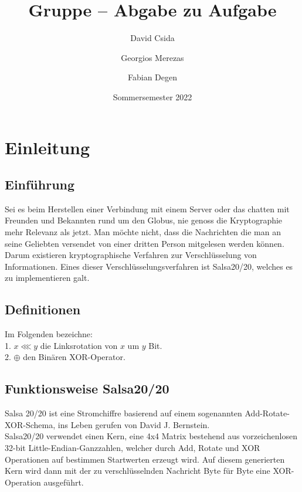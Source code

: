 \documentclass[course=erap]{aspdoc}
\author{David Csida \and Georgios Merezas \and Fabian Degen}
\date{Sommersemester 2022} %
\title{Gruppe \theGroup{} -- Abgabe zu Aufgabe \theNumber}
\begin{document}
\maketitle

\section{Einleitung}
\subsection{Einführung}
Sei es beim Herstellen einer Verbindung mit einem Server oder das chatten mit Freunden und Bekannten rund um den Globus, nie genoss die Kryptographie mehr Relevanz als jetzt.
Man möchte nicht, dass die Nachrichten die man an seine Geliebten versendet von einer dritten Person mitgelesen werden können. Darum existieren kryptographische Verfahren zur Verschlüsselung von Informationen.
Eines dieser Verschlüsselungsverfahren ist Salsa20/20, welches es zu implementieren galt.

\subsection{Definitionen}
Im Folgenden bezeichne: 
\\ \hspace*{5mm} 1. $x \lll y$ die Linksrotation von $x$ um $y$ Bit. 
\\ \hspace*{5mm} 2. $\oplus$ den Binären XOR-Operator.

\subsection{Funktionsweise Salsa20/20}
Salsa 20/20 ist eine Stromchiffre basierend auf einem sogenannten Add-Rotate-XOR-Schema, ins Leben gerufen von David J. Bernstein.
\\Salsa20/20 verwendet einen Kern, eine 4x4 Matrix bestehend aus vorzeichenlosen 32-bit Little-Endian-Ganzzahlen, welcher durch Add, Rotate und XOR Operationen auf bestimmen Startwerten erzeugt wird.
Auf diesem generierten Kern wird dann mit der zu verschlüsselnden Nachricht Byte für Byte eine XOR-Operation ausgeführt.
\end{document}
